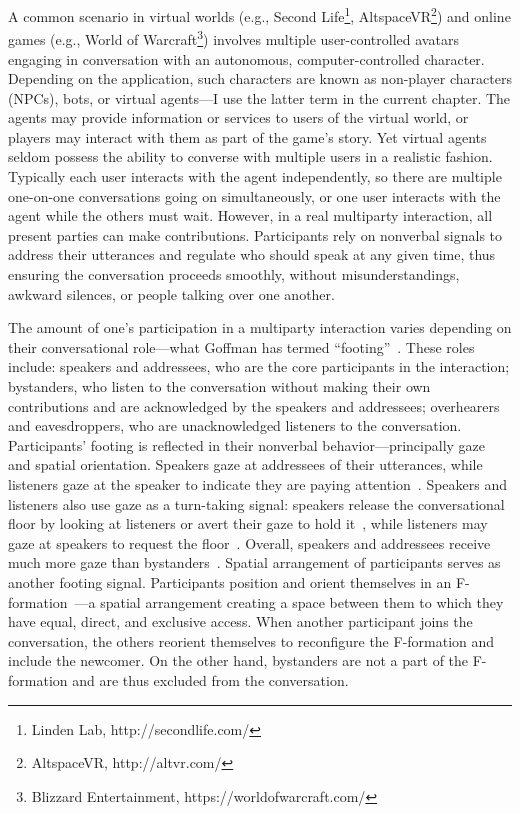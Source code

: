 A common scenario in virtual worlds (e.g., Second Life\footnote{Linden Lab, http://secondlife.com/}, AltspaceVR\footnote{AltspaceVR, http://altvr.com/}) and online games (e.g., World of Warcraft\footnote{Blizzard Entertainment, https://worldofwarcraft.com/}) involves multiple user-controlled avatars engaging in conversation with an autonomous, computer-controlled character. Depending on the application, such characters are known as non-player characters (NPCs), bots, or virtual agents---I use the latter term in the current chapter. The agents may provide information or services to users of the virtual world, or players may interact with them as part of the game's story. Yet virtual agents seldom possess the ability to converse with multiple users in a realistic fashion. Typically each user interacts with the agent independently, so there are multiple one-on-one conversations going on simultaneously, or one user interacts with the agent while the others must wait. However, in a real multiparty interaction, all present parties can make contributions. Participants rely on nonverbal signals to address their utterances and regulate who should speak at any given time, thus ensuring the conversation proceeds smoothly, without misunderstandings, awkward silences, or people talking over one another.

The amount of one's participation in a multiparty interaction varies depending on their conversational role---what Goffman has termed ``footing''~\citep{goffman1979footing}. These roles include: speakers and addressees, who are the core participants in the interaction; bystanders, who listen to the conversation without making their own contributions and are acknowledged by the speakers and addressees; overhearers and eavesdroppers, who are unacknowledged listeners to the conversation. Participants' footing is reflected in their nonverbal behavior---principally gaze and spatial orientation. Speakers gaze at addressees of their utterances, while listeners gaze at the speaker to indicate they are paying attention~\citep{heylen2006head}. Speakers and listeners also use gaze as a turn-taking signal: speakers release the conversational floor by looking at listeners or avert their gaze to hold it~\citep{kendon1967some}, while listeners may gaze at speakers to request the floor~\citep{wiemann1975turn}.
Overall, speakers and addressees receive much more gaze than bystanders~\citep{mutlu2012conversational}. Spatial arrangement of participants serves as another footing signal. Participants position and orient themselves in an F-formation~\citep{kendon1990conducting}---a spatial arrangement creating a space between them to which they have equal, direct, and exclusive access. When another participant joins the conversation, the others reorient themselves to reconfigure the F-formation and include the newcomer. On the other hand, bystanders are not a part of the F-formation and are thus excluded from the conversation.


